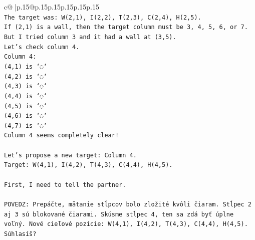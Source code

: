 \documentclass{article}
\begin{document}
{\begin{supertabular}{c@{$\;$}|p{.15\linewidth}@{}p{.15\linewidth}p{.15\linewidth}p{.15\linewidth}p{.15\linewidth}p{.15\linewidth}}
{{{\\ 
\texttt{The target was: W(2,1), I(2,2), T(2,3), C(2,4), H(2,5).} \\
\texttt{If (2,1) is a wall, then the target column must be 3, 4, 5, 6, or 7.} \\
\texttt{But I tried column 3 and it had a wall at (3,5).} \\
\texttt{Let's check column 4.} \\
\texttt{Column 4:} \\
\texttt{(4,1) is `◌`} \\
\texttt{(4,2) is `◌`} \\
\texttt{(4,3) is `◌`} \\
\texttt{(4,4) is `◌`} \\
\texttt{(4,5) is `◌`} \\
\texttt{(4,6) is `◌`} \\
\texttt{(4,7) is `◌`} \\
\texttt{Column 4 seems completely clear!} \\
\\ 
\texttt{Let's propose a new target: Column 4.} \\
\texttt{Target: W(4,1), I(4,2), T(4,3), C(4,4), H(4,5).} \\
\\ 
\texttt{First, I need to tell the partner.} \\
\\ 
\texttt{POVEDZ: Prepáčte, mätanie stĺpcov bolo zložité kvôli čiaram. Stĺpec 2 aj 3 sú blokované čiarami. Skúsme stĺpec 4, ten sa zdá byť úplne voľný. Nové cieľové pozície: W(4,1), I(4,2), T(4,3), C(4,4), H(4,5). Súhlasíš?} \\
            }
        }
    }
     \\ \\


\end{supertabular}}
\end{document}
